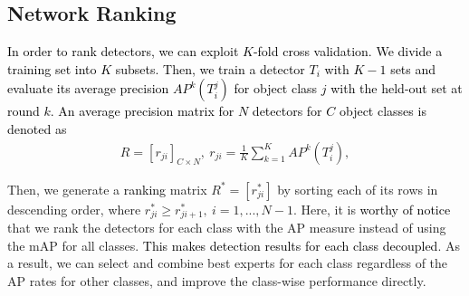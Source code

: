 \documentclass[10pt,twocolumn,letterpaper]{article}
\newcommand{\RE}{\textcolor{black}}
\newcommand{\RV}{\textcolor{black}}
\begin{document}


\subsection{Network Ranking}
\RV{In order to rank detectors, we can exploit $K$-fold cross validation. We divide a training set into $K$ subsets. Then, we train a detector $T_{i}$ with $K-1$ sets and evaluate its average precision $AP^{k}(T_{i}^{j})$ for  object class $j$ with the \RV{held-out} set at round $k$. An average precision matrix for $N$ detectors for $C$ object classes  is denoted as    
}
%
\begin{equation}\label{eq:Rmatrix} 
\begin{array}{lc} 
 R =[r_{ji}]_{C \times N},~r_{ji} = \frac{1}{K} \sum_{k=1}^{K} AP^{k}(T_{i}^{j} ),
\end{array}
\end{equation}
%

Then, we generate a \RE{ranking} matrix $R^{*} = [r^{*}_{ji}]$ by sorting each of its rows in descending order, where $r^{*}_{ji}  \geq r^{*}_{ji+1},~i=1,...,N-1$. Here, it is \RV{worthy of notice} that we rank the detectors for each class with the AP measure instead of using the mAP for all classes. \RV{This makes detection results for each class decoupled}. As a result, we can select and combine best experts for each class regardless of the AP rates for other classes, and improve the class-wise performance directly. 

\end{document}
